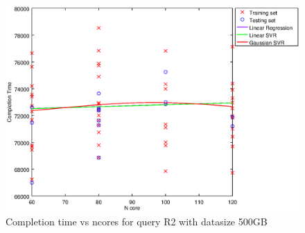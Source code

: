 
\begin {figure}[hbtp]
\centering
\includegraphics[width=\textwidth]{output/R2_500_LINEAR_NCORE/plot_R2_500_bestmodels.eps}
\caption{Completion time vs ncores for query R2 with datasize 500GB}
\label{fig:coreonly_linear_R2_500}
\end {figure}
